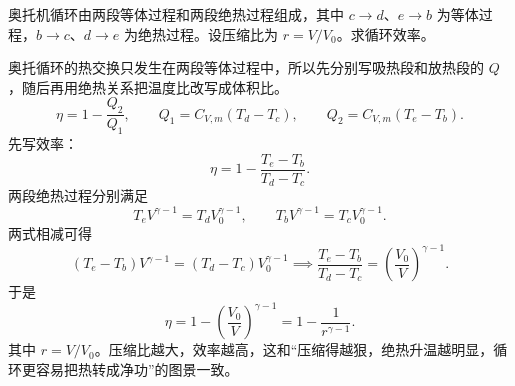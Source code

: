 \begin{exercise}[奥托循环效率]
奥托机循环由两段等体过程和两段绝热过程组成，其中 \(c\to d\)、\(e\to b\) 为等体过程，\(b\to c\)、\(d\to e\) 为绝热过程。设压缩比为 \(r=V/V_0\)。求循环效率。
\end{exercise}

\begin{solution}
奥托循环的热交换只发生在两段等体过程中，所以先分别写吸热段和放热段的 \(Q\)，随后再用绝热关系把温度比改写成体积比。
 \[\eta=1-\frac{Q_2}{Q_1},\qquad Q_1=C_{V,m}(T_d-T_c),\qquad Q_2=C_{V,m}(T_e-T_b).\]
先写效率：
 \[\eta=1-\frac{T_e-T_b}{T_d-T_c}.\]
两段绝热过程分别满足
 \[T_eV^{\gamma-1}=T_dV_0^{\gamma-1},\qquad T_bV^{\gamma-1}=T_cV_0^{\gamma-1}.\] 
两式相减可得
\[
(T_e-T_b)V^{\gamma-1}=(T_d-T_c)V_0^{\gamma-1}
\implies
\frac{T_e-T_b}{T_d-T_c}=\left(\frac{V_0}{V}\right)^{\gamma-1}.
\]
于是
 \[\eta=1-\left(\frac{V_0}{V}\right)^{\gamma-1} =1-\frac{1}{r^{\gamma-1}}.\]
其中 \(r=V/V_0\)。压缩比越大，效率越高，这和“压缩得越狠，绝热升温越明显，循环更容易把热转成净功”的图景一致。
\end{solution}
